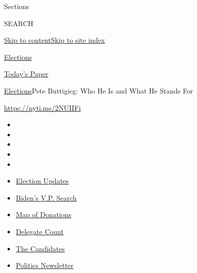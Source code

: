 Sections

SEARCH

\protect\hyperlink{site-content}{Skip to
content}\protect\hyperlink{site-index}{Skip to site index}

\href{https://www.nytimes.com/news-event/2020-election}{Elections}

\href{https://myaccount.nytimes.com/auth/login?response_type=cookie\&client_id=vi}{}

\href{https://www.nytimes.com/section/todayspaper}{Today's Paper}

\href{/news-event/2020-election}{Elections}\textbar{}Pete Buttigieg: Who
He Is and What He Stands For

\url{https://nyti.ms/2NUIIFi}

\begin{itemize}
\item
\item
\item
\item
\item
\end{itemize}

\begin{itemize}
\item
  \href{https://www.nytimes.com/2020/07/31/us/elections/biden-vs-trump.html?action=click\&pgtype=Article\&state=default\&region=TOP_BANNER\&context=storylines_menu}{Election
  Updates}
\item
  \href{https://www.nytimes.com/article/biden-vice-president-2020.html?action=click\&pgtype=Article\&state=default\&region=TOP_BANNER\&context=storylines_menu}{Biden's
  V.P. Search}
\item
  \href{https://www.nytimes.com/interactive/2020/07/24/us/politics/trump-biden-campaign-donors.html?action=click\&pgtype=Article\&state=default\&region=TOP_BANNER\&context=storylines_menu}{Map
  of Donations}
\item
  \href{https://www.nytimes.com/interactive/2020/us/elections/delegate-count-primary-results.html?action=click\&pgtype=Article\&state=default\&region=TOP_BANNER\&context=storylines_menu}{Delegate
  Count}
\item
  \href{https://www.nytimes.com/interactive/2019/us/politics/2020-presidential-candidates.html?action=click\&pgtype=Article\&state=default\&region=TOP_BANNER\&context=storylines_menu}{The
  Candidates}
\item
  \href{https://www.nytimes.com/newsletters/politics?action=click\&pgtype=Article\&state=default\&region=TOP_BANNER\&context=storylines_menu}{Politics
  Newsletter}
\end{itemize}

